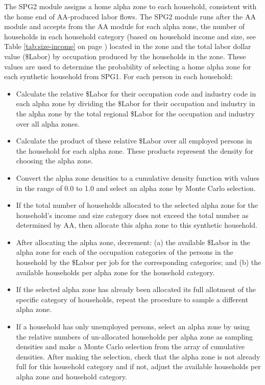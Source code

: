 The SPG2 module assigns a home alpha zone to each household, consistent with the home end of AA-produced labor flows. The SPG2 module runs after the AA module and accepts from the AA module for each alpha zone, the number of households in each household category (based on household income and size, see Table \ref{tab:size-income} on page \pageref{tab:size-income}) located in the zone and the total labor dollar value (\$Labor) by occupation produced by the households in the zone. These values are used to determine the probability of selecting a home alpha zone for each synthetic household from SPG1. For each person in each household:
\begin{itemize}
\item Calculate the relative \$Labor for their occupation code and industry code in each alpha zone by dividing the \$Labor for their occupation and industry in the alpha zone by the total regional \$Labor for the occupation and industry over all alpha zones.
\item Calculate the product of these relative \$Labor over all employed persons in the household for each alpha zone. These products represent the density for choosing the alpha zone.
\item Convert the alpha zone densities to a cumulative density function with values in the range of 0.0 to 1.0 and select an alpha zone by Monte Carlo selection.
\item If the total number of households allocated to the selected alpha zone for the household's income and size category does not exceed the total number as determined by AA, then allocate this alpha zone to this synthetic household.
\item After allocating the alpha zone, decrement: (a) the available \$Labor in the alpha zone for each of the occupation categories of the persons in the household by the \$Labor per job for the corresponding categories; and (b) the available households per alpha zone for the household category.
\item If the selected alpha zone has already been allocated its full allotment of the specific category of households, repeat the procedure to sample a different alpha zone.
\item If a household has only unemployed persons, select an alpha zone by using the relative numbers of un-allocated households per alpha zone as sampling densities and make a Monte Carlo selection from the array of cumulative densities. After making the selection, check that the alpha zone is not already full for this household category and if not, adjust the available households per alpha zone and household category.
\end{itemize}


